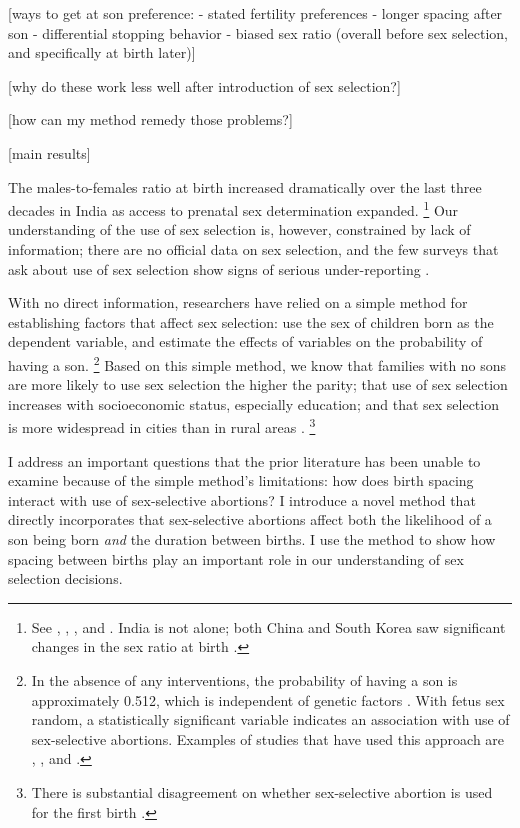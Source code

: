 \documentclass[12pt,letterpaper]{article}
\begin{document}
[ways to get at son preference:
- stated fertility preferences
- longer spacing after son
- differential stopping behavior
- biased sex ratio (overall before sex selection, and specifically at birth later)]

[why do these work less well after introduction of sex selection?]

[how can my method remedy those problems?]

[main results]

The males-to-females ratio at birth increased dramatically over the last three 
decades in India as access to prenatal sex determination expanded.%
\footnote{
See \citet{das_gupta97}, \citet{Sudha1999},
\citet{Arnold2002}, \cite{retherford03b} and \citet{jha06}.
India is not alone; both China and South Korea saw
significant changes in the sex ratio at birth \citep{Yi1993,park95}.
}
Our understanding of the use of sex selection is, however, constrained by 
lack of information;
there are no official data on sex selection, and the few surveys that ask about use of 
sex selection show signs of serious under-reporting \citep{goodkind96}.


With no direct information, researchers have relied on a simple method for establishing 
factors that affect sex selection: use the sex of children born as the 
dependent variable, and estimate the effects of variables on the probability of having a son.%
\footnote{
In the absence of any interventions, the probability of having a son
is approximately 0.512, which is independent of genetic factors \citep{ben-porath76b,jacobsen99}.
With fetus sex random, a statistically significant variable indicates an association with 
use of sex-selective abortions.
Examples of studies that have used this approach are \cite{retherford03b},
\cite{jha06}, and \cite{abrevaya09}. 
}
Based on this simple method, we know that families with no sons are more likely to
use sex selection the higher the parity;
that use of sex selection increases with socioeconomic status, especially education;
and that sex selection is more widespread in cities than in rural areas 
\citep{retherford03b,jha06,abrevaya09}.%
\footnote{
There is substantial disagreement on whether sex-selective abortion is used for the 
first birth \citep{retherford03b,jha06}.
}

I address an important questions that the prior literature has been unable
to examine because of the simple method's limitations:
how does birth spacing interact with use of sex-selective abortions?
I introduce a novel method that directly incorporates that sex-selective 
abortions affect both the likelihood of a son being born \emph{and} the duration between 
births.
I use the method to show how spacing between births play an important role in our 
understanding of sex selection decisions.
\end{document}
